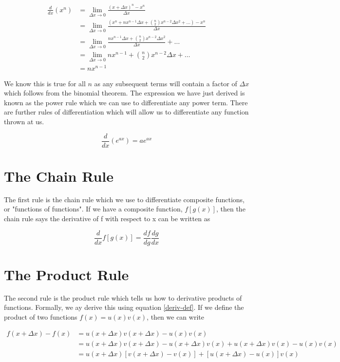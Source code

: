 \begin{align*}
    \frac{d}{dx}(x^{n}) &= \lim_{\Delta x \to 0} \frac{(x + \Delta x)^{n} - x^{n}}{\Delta x}\\
    &= \lim_{\Delta x \to 0} \frac{(x^{n} + n x^{n-1}\Delta x + \binom{n}{2}x^{n-2}\Delta x^{2} +\dots) - x^{n}}{\Delta x}\\
    &= \lim_{\Delta x \to 0} \frac{n x^{n-1}\Delta x + \binom{n}{2}x^{n-2}\Delta x^{2}}{\Delta x} + \dots\\
    &= \lim_{\Delta x \to 0} n x^{n-1} + \binom{n}{2}x^{n-2}\Delta x + \dots\\
    &= n x^{n-1}
\end{align*}

We know this is true for all $n$ as any subsequent terms will contain a factor of $\Delta x$ which 
follows from the binomial theorem. The expression we have just derived is known as the power rule
which we can use to differentiate any power term. There are further rules of differentiation which
will allow us to differentiate any function thrown at us.

\begin{equation*}
    \frac{d}{dx}(e^{ax}) = ae^{ax}
\end{equation*}

\section{The Chain Rule}

The first rule is the chain rule which we use to differentiate composite functions, or "functions
of functions". If we have a composite function, $f[g(x)]$, then the chain rule says the derivative
of f with respect to x can be written as

\begin{equation*}
    \frac{d}{dx}f[g(x)] = \frac{df}{dg} \frac{dg}{dx}
\end{equation*}

\section{The Product Rule}

The second rule is the product rule which tells us how to derivative products of functions. Formally, we 
ay derive this using equation \ref*{deriv-def}. If we define the product of two functions $f(x) = u(x)v(x)$,
then we can write

\begin{align*}
    f(x + \Delta x) - f(x) &= u(x + \Delta x)v(x + \Delta x) - u(x)v(x)\\
    &= u(x + \Delta x)v(x + \Delta x) - u(x + \Delta x)v(x) + u(x + \Delta x)v(x) - u(x)v(x)\\
    &= u(x + \Delta x)\left[v(x + \Delta x) - v(x)\right] + \left[u(x + \Delta x) - u(x)\right]v(x)\\
\end{align*}

